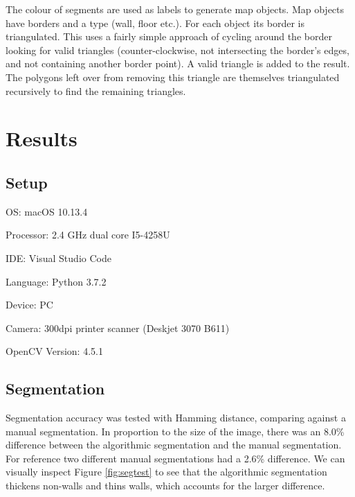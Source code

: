 \documentclass{IEEEtran}
\begin{document}
The colour of segments are used as labels to generate map objects. Map objects have borders and a type (wall, floor etc.). For each object its border is triangulated. This uses a fairly simple approach of cycling around the border looking for valid triangles (counter-clockwise, not intersecting the border's edges, and not containing another border point). A valid triangle is added to the result. The polygons left over from removing this triangle are themselves triangulated recursively to find the remaining triangles. 


\section{Results}

\subsection{Setup}
OS: macOS 10.13.4

Processor: 2.4 GHz dual core I5-4258U

IDE: Visual Studio Code

Language: Python 3.7.2

Device: PC

Camera: 300dpi printer scanner (Deskjet 3070 B611)

OpenCV Version: 4.5.1

\subsection{Segmentation}

Segmentation accuracy was tested with Hamming distance, comparing against a manual segmentation. In proportion to the size of the image, there was an 8.0\% difference between the algorithmic segmentation and the manual segmentation. For reference two different manual segmentations had a 2.6\% difference. We can visually inspect Figure \ref{fig:segtest} to see that the algorithmic segmentation thickens non-walls and thins walls, which accounts for the larger difference.
\end{document}
